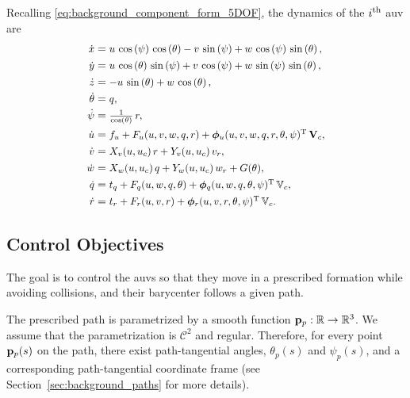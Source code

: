 Recalling \eqref{eq:background_component_form_5DOF}, the dynamics of the $i^{\rm th}$ \gls{auv} are
\begin{subequations}
    \begin{align}
        \scale[0.93]{\dot{x}} &= \scale[0.93]{u\,\cos\left(\psi \right)\,\cos\left(\theta \right)-v\,\sin\left(\psi \right)+w\,\cos\left(\psi \right)\,\sin\left(\theta \right),} \\
        \scale[0.93]{\dot{y}} &= \scale[0.93]{u\,\cos\left(\theta \right)\,\sin\left(\psi \right)+v\,\cos\left(\psi \right)+w\,\sin\left(\psi \right)\,\sin\left(\theta \right),} \\
        \scale[0.93]{\dot{z}} &= \scale[0.93]{-u\,\sin\left(\theta \right)+w\,\cos\left(\theta \right),} \\
        \scale[0.93]{\dot{\theta}} &= \scale[0.93]{q,} \label{eq:nsb_5dof_theta_dot} \\
        \scale[0.93]{\dot{\psi}} &= \scale[0.93]{\frac{1}{\cos\left(\theta \right)}\,r,} \label{eq:nsb_5dof_psi_dot} \\
        \scale[0.93]{\dot{u}} &= \scale[0.93]{f_u + F_u(u, v, w, q, r) + \bs{\phi}_u(u, v, w, q, r, \theta, \psi)\T\,\ocean,} \label{eq:nsb_5dof_u_dot} \\
        \scale[0.93]{\dot{v}} &= \scale[0.93]{X_v(u, u_c)\,r + Y_v(u, u_c)\,v_r,} \\
        \scale[0.93]{\dot{w}} &= \scale[0.93]{X_w(u, u_c)\,q + Y_w(u, u_c)\,w_r + G(\theta),} \\
        \scale[0.93]{\dot{q}} &= \scale[0.93]{t_q + F_q(u, w, q, \theta) + \bs{\phi}_q(u, w, q, \theta, \psi)\T\,\mathbb{V}_c,} \label{eq:nsb_5dof_q_dot} \\
        \scale[0.93]{\dot{r}} &= \scale[0.93]{t_r + F_r(u, v, r) + \bs{\phi}_r(u, v, r, \theta, \psi)\T\,\mathbb{V}_c.} \label{eq:nsb_5dof_r_dot} 
    \end{align} \label{eq:nsb_5dof_components}
\end{subequations}

\subsection{Control Objectives}
\label{sec:nsb_5dof_objectives}
The goal is to control the \glspl{auv} so that they move in a prescribed formation while avoiding collisions, and their barycenter follows a given path.

The prescribed path is parametrized by a smooth function $\mathbf{p}_p: \mathbb{R} \rightarrow \mathbb{R}^3$.
We assume that the parametrization is $\mathcal{C}^2$ and regular.
Therefore, for every point $\mathbf{p}_p(s)$ on the path, there exist path-tangential angles, $\theta_p(s)$ and $\psi_p(s)$, and a corresponding path-tangential coordinate frame (see Section~\ref{sec:background_paths} for more details).

